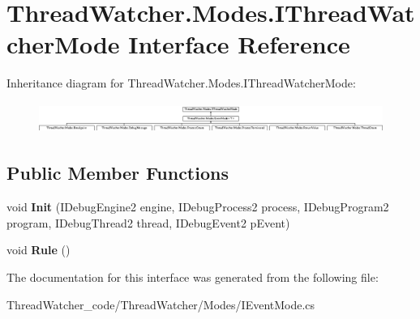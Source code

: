 \hypertarget{interface_thread_watcher_1_1_modes_1_1_i_thread_watcher_mode}{\section{Thread\+Watcher.\+Modes.\+I\+Thread\+Watcher\+Mode Interface Reference}
\label{interface_thread_watcher_1_1_modes_1_1_i_thread_watcher_mode}
}
Inheritance diagram for Thread\+Watcher.\+Modes.\+I\+Thread\+Watcher\+Mode\+:\begin{figure}[H]
\begin{center}
\leavevmode
\includegraphics[height=1.018182cm]{interface_thread_watcher_1_1_modes_1_1_i_thread_watcher_mode}
\end{center}
\end{figure}
\subsection*{Public Member Functions}
\begin{DoxyCompactItemize}
\item 
\hypertarget{interface_thread_watcher_1_1_modes_1_1_i_thread_watcher_mode_a1e444364998beb98e95da2ece92b1230}{void {\bfseries Init} (I\+Debug\+Engine2 engine, I\+Debug\+Process2 process, I\+Debug\+Program2 program, I\+Debug\+Thread2 thread, I\+Debug\+Event2 p\+Event)}\label{interface_thread_watcher_1_1_modes_1_1_i_thread_watcher_mode_a1e444364998beb98e95da2ece92b1230}

\item 
\hypertarget{interface_thread_watcher_1_1_modes_1_1_i_thread_watcher_mode_a16133f6a38ccd18bbe29c31f15181f24}{void {\bfseries Rule} ()}\label{interface_thread_watcher_1_1_modes_1_1_i_thread_watcher_mode_a16133f6a38ccd18bbe29c31f15181f24}

\end{DoxyCompactItemize}


The documentation for this interface was generated from the following file\+:\begin{DoxyCompactItemize}
\item 
Thread\+Watcher\+\_\+code/\+Thread\+Watcher/\+Modes/I\+Event\+Mode.\+cs\end{DoxyCompactItemize}
